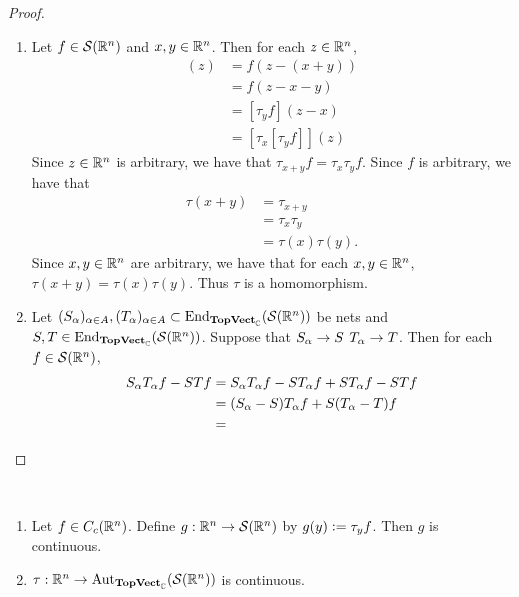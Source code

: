 \documentclass{book}
\begin{document}
	\begin{proof}\
		\begin{enumerate}
			\item Let $f \in \mathcal{S}(\mathbb{R}^n)$ and $x,y \in \mathbb{R}^n$. Then for each $z \in \mathbb{R}^n$,
			\begin{align*}
				[\tau_{x+y}f](z)
				& = f(z -(x + y)) \\
				& = f(z - x - y) \\
				& = [\tau_yf](z-x) \\
				& = [\tau_x [\tau_yf]](z)
			\end{align*}
			Since $z \in \mathbb{R}^n$ is arbitrary, we have that $\tau_{x+y}f = \tau_x \tau_yf$. Since $f$ is arbitrary, we have that 
			\begin{align*}
				\tau(x+y)
				& = \tau_{x+y} \\
				& = \tau_x \tau_y \\
				& = \tau(x)\tau(y).
			\end{align*}
			Since $x,y \in \mathbb{R}^n$ are arbitrary, we have that for each $x,y \in \mathbb{R}^n$, $\tau(x+y) = \tau(x) \tau(y)$. Thus $\tau$ is a homomorphism.
			\item Let $(S_{\alpha})_{\alpha \in A}, (T_{\alpha})_{\alpha \in A}  \subset \operatorname{\text{End}}_{\operatorname*{\text{\textbf{TopVect}}}_{\mathbb{C}}}(\mathcal{S}(\mathbb{R}^n))$ be nets and $S,T \in \operatorname{\text{End}}_{\operatorname*{\text{\textbf{TopVect}}}_{\mathbb{C}}}(\mathcal{S}(\mathbb{R}^n))$. Suppose that $S_{\alpha} \rightarrow S$ $T_{\alpha} \rightarrow T$. Then for each $f \in \mathcal{S}(\mathbb{R}^n)$,
			\begin{align*}
				S_{\alpha}T_{\alpha}f - STf
				& = S_{\alpha}T_{\alpha}f - ST_{\alpha}f + ST_{\alpha}f - STf \\
				& = (S_{\alpha}-S)T_{\alpha}f + S(T_{\alpha} - T)f \\
				& = 
			\end{align*} 
		\end{enumerate}
	\end{proof}
	
	\begin{ex}\
		\begin{enumerate}
			\item Let $f \in C_c(\mathbb{R}^n)$. Define $g: \mathbb{R}^n \rightarrow \mathcal{S}(\mathbb{R}^n)$ by $g(y) \vcentcolon= \tau_y f$. Then $g$ is continuous.
			\item $\tau: \mathbb{R}^n \rightarrow \operatorname{Aut}_{\operatorname*{\text{\textbf{TopVect}}}_{\mathbb{C}}}(\mathcal{S}(\mathbb{R}^n))$ is continuous.
		\end{enumerate}
	\end{ex}
	
\end{document}
